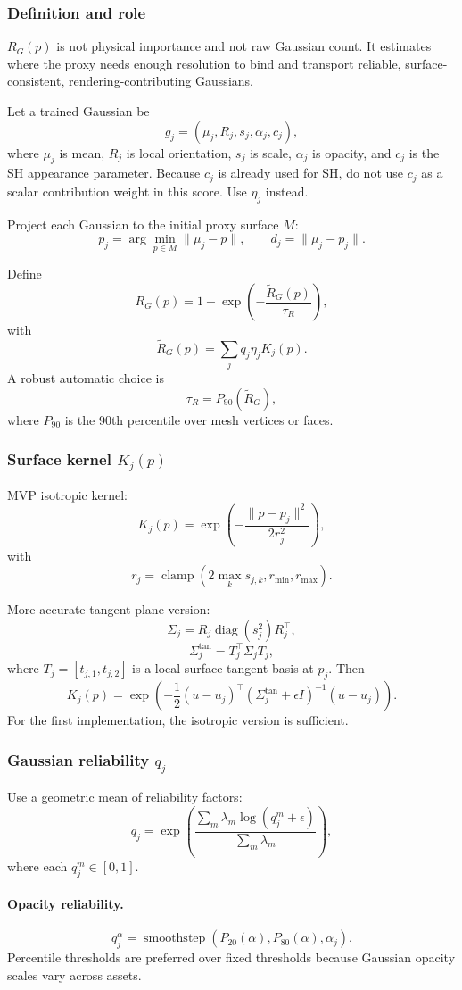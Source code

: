\documentclass[11pt,a4paper]{article}
\newcommand{\Rraw}{\widetilde{R}_G}
\newcommand{\clamp}{\operatorname{clamp}}
\newcommand{\smoothstep}{\operatorname{smoothstep}}
\begin{document}
\subsubsection{Definition and role}

$R_G(p)$ is not physical importance and not raw Gaussian count. It estimates where the proxy needs enough resolution to bind and transport reliable, surface-consistent, rendering-contributing Gaussians.

Let a trained Gaussian be
\[
g_j=(\mu_j,R_j,s_j,\alpha_j,c_j),
\]
where $\mu_j$ is mean, $R_j$ is local orientation, $s_j$ is scale, $\alpha_j$ is opacity, and $c_j$ is the SH appearance parameter. Because $c_j$ is already used for SH, do not use $c_j$ as a scalar contribution weight in this score. Use $\eta_j$ instead.

Project each Gaussian to the initial proxy surface $M$:
\[
p_j=\arg\min_{p\in M}\|\mu_j-p\|,
\qquad
 d_j=\|\mu_j-p_j\|.
\]

Define
\[
R_G(p)=1-\exp\left(-\frac{\Rraw(p)}{\tau_R}\right),
\]
with
\[
\Rraw(p)=\sum_j q_j\eta_j K_j(p).
\]
A robust automatic choice is
\[
\tau_R=P_{90}(\Rraw),
\]
where $P_{90}$ is the 90th percentile over mesh vertices or faces.

\subsubsection{Surface kernel $K_j(p)$}

MVP isotropic kernel:
\[
K_j(p)=\exp\left(-\frac{\|p-p_j\|^2}{2r_j^2}\right),
\]
with
\[
r_j=\clamp\left(2\max_k s_{j,k},r_{\min},r_{\max}\right).
\]

More accurate tangent-plane version:
\[
\Sigma_j=R_j\operatorname{diag}(s_j^2)R_j^\top,
\]
\[
\Sigma_j^{\mathrm{tan}}=T_j^\top \Sigma_j T_j,
\]
where $T_j=[t_{j,1},t_{j,2}]$ is a local surface tangent basis at $p_j$. Then
\[
K_j(p)=\exp\left(-\frac{1}{2}(u-u_j)^\top(\Sigma_j^{\mathrm{tan}}+\epsilon I)^{-1}(u-u_j)\right).
\]
For the first implementation, the isotropic version is sufficient.

\subsubsection{Gaussian reliability $q_j$}

Use a geometric mean of reliability factors:
\[
q_j=\exp\left(
\frac{\sum_m \lambda_m\log(q_j^m+\epsilon)}{\sum_m\lambda_m}
\right),
\]
where each $q_j^m\in[0,1]$.

\paragraph{Opacity reliability.}
\[
q_j^{\alpha}=\smoothstep(P_{20}(\alpha),P_{80}(\alpha),\alpha_j).
\]
Percentile thresholds are preferred over fixed thresholds because Gaussian opacity scales vary across assets.
\end{document}
